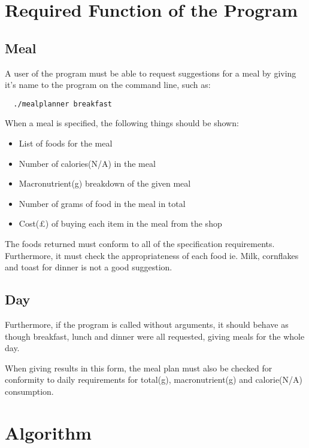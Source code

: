 \documentclass[a4paper]{article}
\begin{document}
\section{Required Function of the Program}

\subsection{Meal}

A user of the program must be able to request suggestions for a meal by giving it's name 
to the program on the command line, such as:

\begin{verbatim}
  ./mealplanner breakfast
\end{verbatim}

When a meal is specified, the following things should be shown:

\begin{itemize}
  \item List of foods for the meal
  \item Number of calories(N/A) in the meal
  \item Macronutrient(g) breakdown of the given meal
  \item Number of grams of food in the meal in total
  \item Cost(£) of buying each item in the meal from the shop
\end{itemize}

The foods returned must conform to all of the specification 
requirements. Furthermore, it must check the appropriateness of each 
food ie. Milk, cornflakes and toast for dinner is not a good suggestion.

\subsection{Day}

Furthermore, if the program is called without arguments, it should 
behave as though breakfast, lunch and dinner were all requested, giving 
meals for the whole day.

When giving results in this form, the meal plan must also be checked for 
conformity to daily requirements for total(g), macronutrient(g) and 
calorie(N/A) consumption.

\section{Algorithm}
\end{document}

